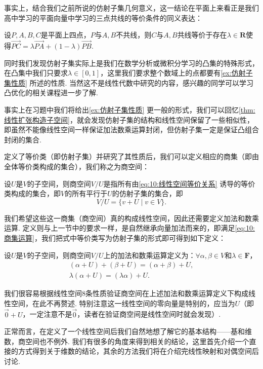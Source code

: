 \begin{solution}

\end{solution}

事实上，结合我们之前所说的仿射子集几何意义，这一结论在平面上来看正是我们高中学习的平面向量中学习的三点共线的等价条件的同义表达：
\begin{theorem}{}{}
    设$P,A,B,C$是平面上四点，$P$与$A,B$不共线，则$C$与$A,B$共线等价于存在$\lambda\in\mathbf{R}$使得$\overrightarrow{PC}=\lambda\overrightarrow{PA}+(1-\lambda)\overrightarrow{PB}$.
\end{theorem}
同时我们发现仿射子集实际上是我们在数学分析或微积分学习的凸集的特殊形式，在凸集中我们只要求$\lambda\in[0,1]$，这里我们要求整个数域上的点都要有\autoref{ex:仿射子集性质} 所述的性质. 当然这不是线性代数中研究的内容，感兴趣的同学可以学习凸优化的相关课程进一步了解.

事实上在习题中我们将给出\autoref*{ex:仿射子集性质} 更一般的形式，我们可以回忆\autoref{thm:线性扩张构造子空间}，就会发现仿射子集的结构和线性空间保留了一些相似性，即虽然不能像线性空间一样保证加法数乘运算封闭，但仿射子集一定是保证凸组合封闭的集合.

定义了等价类（即仿射子集）并研究了其性质后，我们可以定义相应的商集（即由全体等价类构成的集合），我们称之为商空间：
\begin{definition}{}{}
    设$U$是$V$的子空间，则商空间$V/U$是指所有由\autoref{eq:10:线性空间等价关系} 诱导的等价类构成的集合，即$V$的所有平行于$U$的仿射子集的集合，即
    \[V/U=\{v+U \mid v\in V\}.\]
\end{definition}
我们希望这些这一商集（商空间）真的构成线性空间，因此还需要定义加法和数乘运算. 定义则与上一节中的要求一样，是自然继承向量加法而来的，即满足\autoref{eq:10:商集运算}，我们把式中等价类写为仿射子集的形式即可得到如下定义：
\begin{definition}{}{}
    设$U$是$V$的子空间，则商空间$V/U$上的加法和数乘运算定义为：$\forall \alpha,\beta\in V$和$\lambda\in\mathbf{F}$，
    \begin{gather*}
        (\alpha+U)+(\beta+U)=(\alpha+\beta)+U, \\
        \lambda(\alpha+U)=(\lambda\alpha)+U.
    \end{gather*}
\end{definition}
我们很容易根据线性空间8条性质验证商空间在上述加法和数乘运算定义下构成线性空间，在此不再赘述. 特别注意这一线性空间的零向量是特别的，应当为$U$（即$\vec{0}+U$，一定注意不是$\vec{0}$，读者在验证商空间是线性空间时就会发现）.

正常而言，在定义了一个线性空间后我们自然地想了解它的基本结构——基和维数，商空间也不例外. 我们有很多的角度来得到相关的结论，这里首先介绍一个直接的方式得到关于维数的结论，其余的方法我们将在介绍完线性映射和对偶空间后讨论.

